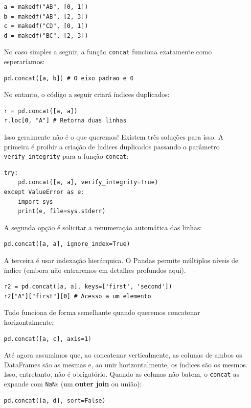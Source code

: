 \documentclass[11pt,a4paper]{article}
\begin{document}
\begin{lstlisting}
a = makedf("AB", [0, 1])
b = makedf("AB", [2, 3])
c = makedf("CD", [0, 1])
d = makedf("BC", [2, 3])
\end{lstlisting}

No caso simples a seguir, a função \texttt{concat} funciona exatamente como esperaríamos:
\begin{lstlisting}
pd.concat([a, b]) # O eixo padrao e 0
\end{lstlisting}

No entanto, o código a seguir criará índices duplicados:
\begin{lstlisting}
r = pd.concat([a, a])
r.loc[0, "A"] # Retorna duas linhas
\end{lstlisting}

Isso geralmente não é o que queremos! Existem três soluções para isso. A primeira é proibir a criação de índices duplicados passando o parâmetro \texttt{verify\_integrity} para a função \texttt{concat}:
\begin{lstlisting}
try:
    pd.concat([a, a], verify_integrity=True)
except ValueError as e:
    import sys
    print(e, file=sys.stderr)
\end{lstlisting}

A segunda opção é solicitar a renumeração automática das linhas:
\begin{lstlisting}
pd.concat([a, a], ignore_index=True)
\end{lstlisting}

A terceira é usar indexação hierárquica. O Pandas permite múltiplos níveis de índice (embora não entraremos em detalhes profundos aqui).
\begin{lstlisting}
r2 = pd.concat([a, a], keys=['first', 'second'])
r2["A"]["first"][0] # Acesso a um elemento
\end{lstlisting}

Tudo funciona de forma semelhante quando queremos concatenar horizontalmente:
\begin{lstlisting}
pd.concat([a, c], axis=1)
\end{lstlisting}

Até agora assumimos que, ao concatenar verticalmente, as colunas de ambos os DataFrames são as mesmas e, ao unir horizontalmente, os índices são os mesmos. Isso, entretanto, não é obrigatório. Quando as colunas não batem, o \texttt{concat} as expande com \texttt{NaN}s (um \textbf{outer join} ou união):
\begin{lstlisting}
pd.concat([a, d], sort=False) 
\end{lstlisting}
\end{document}

